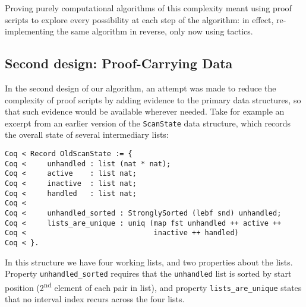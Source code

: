 \documentclass{llncs}
\newif\ifdraft\draftfalse  %
\newcommand{\comment}[3]{\ifdraft\textcolor{#1}{[#2: #3]}\else\fi}
\newcommand{\gts}[1]{\comment{OliveGreen}{GTS}{#1}}
\begin{document}
Proving purely computational algorithms of this complexity meant using proof
scripts to explore every possibility at each step of the algorithm: in effect,
re-implementing the same algorithm in reverse, only now using tactics.

\subsection{Second design: Proof-Carrying Data}
\label{sec:depinduct}

In the second design of our algorithm, an attempt was made to reduce the
complexity of proof scripts by adding evidence to the primary data structures,
so that such evidence would be available wherever needed.  Take for example an
excerpt from an earlier version of the \texttt{ScanState} data structure,
which records the overall state of several intermediary lists:
\gts{maybe call the record type ``ScanStateV2''?}

\begin{flushleft}
\texttt{Coq~{<}~Record~OldScanState~:=~\{}\\
\texttt{Coq~{<}~~~~~unhandled~:~list~(nat~*~nat);}\\
\texttt{Coq~{<}~~~~~active~~~~:~list~nat;}\\
\texttt{Coq~{<}~~~~~inactive~~:~list~nat;}\\
\texttt{Coq~{<}~~~~~handled~~~:~list~nat;}\\
\texttt{Coq~{<}~}\\
\texttt{Coq~{<}~~~~~unhandled\_sorted~:~StronglySorted~(lebf~snd)~unhandled;}\\
\texttt{Coq~{<}~~~~~lists\_are\_unique~:~uniq~(map~fst~unhandled~++~active~++}\\
\texttt{Coq~{<}~~~~~~~~~~~~~~~~~~~~~~~~~~~~~~inactive~++~handled)}\\
\texttt{Coq~{<}~\}.}\\
\end{flushleft}

In this structure we have four working lists, and two properties about
the lists. Property \texttt{unhandled\_sorted} requires that the
\texttt{unhandled} list is sorted by start position
(2\textsuperscript{nd} element of each pair in list), and property
\texttt{lists\_are\_unique} states that no interval index recurs
across the four lists.
\end{document}
